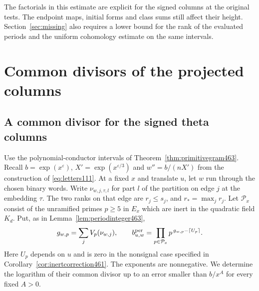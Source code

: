 \documentclass[a4paper,11pt]{article}
\theoremstyle{definition}
\theoremstyle{remark}
\numberwithin{equation}{section}
\begin{document}
The factorials in this estimate are explicit for the signed
columns at the original tests. The endpoint maps, initial forms
and class sums still affect their height. Section~\ref{sec:missing}
also requires a lower bound for the rank of the evaluated periods
and the uniform cohomology estimate on the same intervals.

\section{Common divisors of the projected columns}\label{nav:chapter-projected-period-divisors}

\subsection{A common divisor for the signed theta columns}
\label{sec:commondiv510}

Use the polynomial-conductor intervals of
Theorem~\ref{thm:primitivegram463}. Recall \(b=\exp(x^\varepsilon)\),
\(X'=\exp(x^{\varepsilon/3})\) and \(w''=b/(nX')\) from the
construction of \eqref{eq:letters111}. At a fixed \(x\) and
translate \(u\), let \(w\) run through the chosen binary words.
Write \(\nu_{w,j,\tau,l}\) for part \(l\) of the partition on
edge \(j\) at the embedding \(\tau\). The two ranks on that
edge are \(r_j\le s_j\), and \(r_*=\max_j r_j\).
Let \(\mathcal P_x\) consist of the unramified primes \(p\ge5\)
in \(E_x\) which are inert in the quadratic field \(K_d\).
Put, as in Lemma~\ref{lem:periodinteger463},
\[
  g_{w,p}=\sum_j V_p(\nu_{w,j}),\qquad
  b^{\rm per}_{u,w}=\prod_{p\in\mathcal P_x}
                  p^{\,g_{w,p}-\lceil U_p\rceil}.
\]
Here \(U_p\) depends on \(u\) and is zero in the nonsignal case
specified in Corollary~\ref{cor:inertcorrection461}. The exponents
are nonnegative. We determine the logarithm of their common
divisor up to an error smaller than \(b/x^A\) for every fixed
\(A>0\).
\end{document}
